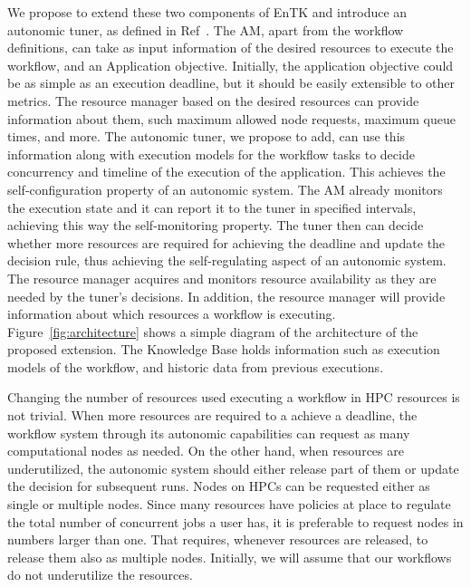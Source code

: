 We propose to extend these two components of EnTK and introduce an autonomic 
tuner, as defined in Ref~\cite{jha2009self}. The AM, apart from the workflow 
definitions, can take as input information of the desired resources to 
execute the workflow, and an Application objective. Initially, the 
application objective could be as simple as an execution deadline, but it 
should be easily extensible to other metrics. The resource manager based on 
the desired resources can provide information about them, such maximum 
allowed node requests, maximum queue times, and more. The autonomic tuner, we 
propose to add, can use this information along with execution models for the 
workflow tasks to decide concurrency and timeline of the execution of the 
application. This achieves the self-configuration property of an autonomic 
system. The AM already monitors the execution state and it can report it to 
the tuner in specified intervals, achieving this way the self-monitoring 
property. The tuner then can decide whether more resources are required for 
achieving the deadline and update the decision rule, thus achieving the 
self-regulating aspect of an autonomic system. The resource manager acquires 
and monitors resource availability as they are needed by the tuner's 
decisions. In addition, the resource manager will provide information about 
which resources a workflow is executing. Figure~\ref{fig:architecture} shows 
a simple diagram of the architecture of the proposed extension. The Knowledge 
Base holds information such as execution models of the workflow, and historic 
data from previous executions.

Changing the number of resources used executing a workflow in HPC resources 
is not trivial. When more resources are required to a achieve a deadline, the 
workflow system through its autonomic capabilities can request as many 
computational nodes as needed.  On the other hand, when resources are 
underutilized, the autonomic system should either release part of them or 
update the decision for subsequent runs. Nodes on HPCs can be requested 
either as single or multiple nodes. Since many resources have policies at 
place to regulate the total number of concurrent jobs a user has, it is 
preferable to request nodes in numbers larger than one. That requires, 
whenever resources are released, to release them also as multiple nodes. 
Initially, we will assume that our workflows do not underutilize the 
resources.



